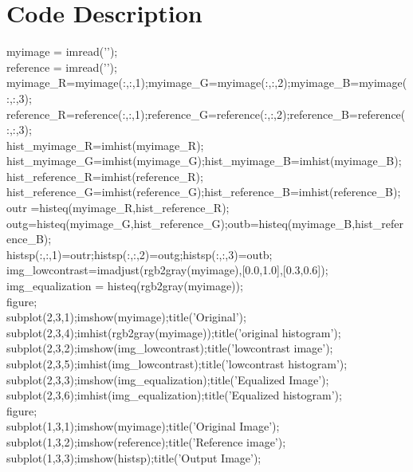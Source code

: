 \documentclass[12pt]{article}
\begin{document}
\section{Code Description}
myimage = imread('');\\
reference = imread('');\\
myimage\_R=myimage(:,:,1);myimage\_G=myimage(:,:,2);myimage\_B=myimage(:,:,3);\\
reference\_R=reference(:,:,1);reference\_G=reference(:,:,2);reference\_B=reference(:,:,3);\\
hist\_myimage\_R=imhist(myimage\_R);\\
hist\_myimage\_G=imhist(myimage\_G);hist\_myimage\_B=imhist(myimage\_B);\\
hist\_reference\_R=imhist(reference\_R);\\
hist\_reference\_G=imhist(reference\_G);hist\_reference\_B=imhist(reference\_B);\\
outr =histeq(myimage\_R,hist\_reference\_R);\\
outg=histeq(myimage\_G,hist\_reference\_G);outb=histeq(myimage\_B,hist\_reference\_B);\\
histsp(:,:,1)=outr;histsp(:,:,2)=outg;histsp(:,:,3)=outb;\\
img\_lowcontrast=imadjust(rgb2gray(myimage),[0.0,1.0],[0.3,0.6]);  \\
img\_equalization = histeq(rgb2gray(myimage));\\
figure;\\
subplot(2,3,1);imshow(myimage);title('Original');\\
subplot(2,3,4);imhist(rgb2gray(myimage));title('original histogram');\\
subplot(2,3,2);imshow(img\_lowcontrast);title('lowcontrast image');\\
subplot(2,3,5);imhist(img\_lowcontrast);title('lowcontrast histogram');\\
subplot(2,3,3);imshow(img\_equalization);title('Equalized Image');\\
subplot(2,3,6);imhist(img\_equalization);title('Equalized histogram');\\
figure;\\
subplot(1,3,1);imshow(myimage);title('Original Image');\\
subplot(1,3,2);imshow(reference);title('Reference image');\\
subplot(1,3,3);imshow(histsp);title('Output Image');\\
\end{document}
